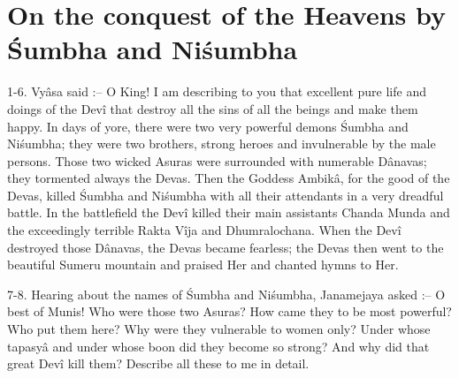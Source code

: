 ﻿\chapter{On the conquest of the Heavens by \'Sumbha and Ni\'sumbha}

1-6. Vy\^asa said :-- O King! I am describing to you that excellent pure life and doings of the Dev\^i that destroy all the sins of all the beings and make them happy. In days of yore, there were two very powerful demons \'Sumbha and Ni\'sumbha; they were two brothers, strong heroes and invulnerable by the male persons. Those two wicked Asuras were surrounded with numerable D\^anavas; they tormented always the Devas. Then the Goddess Ambik\^a, for the good of the Devas, killed \'Sumbha and Ni\'sumbha with all their attendants in a very dreadful battle. In the battlefield the Dev\^i killed their main assistants Chanda Munda and the exceedingly terrible Rakta V\^ija and Dhumralochana. When the Dev\^i destroyed those D\^anavas, the Devas became fearless; the Devas then went to the beautiful Sumeru mountain and praised Her and chanted hymns to Her.

7-8. Hearing about the names of \'Sumbha and Ni\'sumbha, Janamejaya asked :-- O best of Munis! Who were those two Asuras? How came they to be most powerful? Who put them here? Why were they vulnerable to women only? Under whose tapasy\^a and under whose boon did they become so strong? And why did that great Dev\^i kill them? Describe all these to me in detail.

